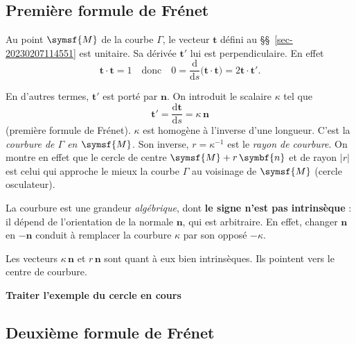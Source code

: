 \documentclass[
  a4paper,
  DIV=11,
  numbers=noendperiod]{scrreprt}
\newcommand{\D}{{\mathrm d}}
\newcommand{\point}[1]{\symsf{#1}}
\renewcommand{\vec}[1]{\symbf{#1}}
\begin{document}
\hypertarget{premiuxe8re-formule-de-fruxe9net}{%
\subsection{Première formule de
Frénet}\label{premiuxe8re-formule-de-fruxe9net}}

Au point \(\point{M}\) de la courbe \(\Gamma\), le vecteur \(\vec{t}\)
défini au §§~\ref{sec-20230207114551} est unitaire. Sa dérivée
\(\vec{t}'\) lui est perpendiculaire. En effet \[
\vec t \cdot \vec t = 1 \quad \text{donc} \quad 0 = \frac{\D}{\D s} \bigl( \vec t \cdot \vec t \bigr) = 2 \vec t \cdot \vec t'.
\]

En d'autres termes, \(\vec t'\) est porté par \(\vec n\). On introduit
le scalaire \(\kappa\) tel que \[
\vec t' = \frac{\D \vec{t}}{\D s} = \kappa \, \vec n
\] (première formule de Frénet). \(\kappa\) est homogène à l'inverse
d'une longueur. C'est la \emph{courbure de \(\Gamma\) en \(\point{M}\)}.
Son inverse, \(r = \kappa^{-1}\) est le \emph{rayon de courbure}. On
montre en effet que le cercle de centre \(\point{M} + r \, \vec{n}\) et
de rayon \(\lvert r \rvert\) est celui qui approche le mieux la courbe
\(\Gamma\) au voisinage de \(\point{M}\) (cercle osculateur).

\begin{tcolorbox}[enhanced jigsaw, toprule=.15mm, breakable, left=2mm, rightrule=.15mm, colbacktitle=quarto-callout-note-color!10!white, colframe=quarto-callout-note-color-frame, title=\textcolor{quarto-callout-note-color}{\faInfo}\hspace{0.5em}{Note}, bottomtitle=1mm, arc=.35mm, coltitle=black, opacityback=0, leftrule=.75mm, titlerule=0mm, toptitle=1mm, bottomrule=.15mm, opacitybacktitle=0.6, colback=white]

La courbure est une grandeur \emph{algébrique}, dont \textbf{le signe
n'est pas intrinsèque} : il dépend de l'orientation de la normale
\(\vec n\), qui est arbitraire. En effet, changer \(\vec n\) en
\(-\vec n\) conduit à remplacer la courbure \(\kappa\) par son opposé
\(-\kappa\).

Les vecteurs \(\kappa \, \vec n\) et \(r \, \vec n\) sont quant à eux
bien intrinsèques. Ils pointent vers le centre de courbure.

\textbf{Traiter l'exemple du cercle en cours}

\end{tcolorbox}

\hypertarget{deuxiuxe8me-formule-de-fruxe9net}{%
\subsection{Deuxième formule de
Frénet}\label{deuxiuxe8me-formule-de-fruxe9net}}
\end{document}
